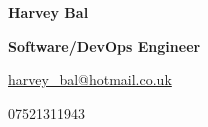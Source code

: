 \documentclass[10pt, a4paper]{article}
\begin{document}
    \begin{center}
      {\LARGE \textbf{Harvey Bal}} \par
      {\large \textbf{Software/DevOps Engineer}} \par
      {\href{mailto:harvey_bal@hotmail.co.uk}{ harvey\_bal@hotmail.co.uk}} \par
      { 07521311943} \par

\end{center}
\end{document}
